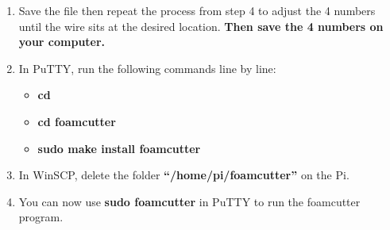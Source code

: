 \documentclass[titlepage,12pt,letter]{report}
\numberwithin{equation}{chapter}
\begin{document}
\begin{enumerate}[itemsep = 5pt,topsep=0pt]
\item Save the file then repeat the process from step 4 to adjust the 4 numbers until the wire sits at the desired location. \textbf{Then save the 4 numbers on your computer.}
\item In PuTTY, run the following commands line by line:
\begin{itemize}[noitemsep,topsep=0pt]
	\item \textbf{cd}
	\item \textbf{cd foamcutter}
	\item \textbf{sudo make install foamcutter}
\end{itemize}
\item In WinSCP, delete the folder \textbf{``/home/pi/foamcutter''} on the Pi.
\item You can now use \textbf{sudo foamcutter} in PuTTY to run the foamcutter program.
\end{enumerate}
\end{document}
